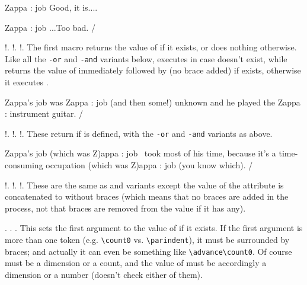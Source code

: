\ifattribute Zappa : job {Good, it is.}{...}\par
\nometa\ifattribute Zappa : job {...}{Too bad.}
\Example/





\describe*!\usevalue\paramatt.
\describe!\usevalueor\paramatt\orvalue.
\describe!\usevalueand\paramatt\andvalue\orvalue.
The first macro returns the value of \paramatt if it exists, or
does nothing otherwise. Like all the \verb/-or/ and \verb/-and/
variants below, \com\usevalueor executes \orvalue in case 
\paramatt doesn't exist, while \com\usevalueand returns
the value of \paramatt immediately followed by \andvalue
(no brace added) if \paramatt exists, otherwise it executes
\orvalue.

\Example
Zappa's job was \usevalueand Zappa : job 
                             { (and then some!)}
                             {unknown}
and he played the \usevalueor Zappa : instrument 
                              {guitar}.
\Example/


\describe*!\passvalue\codarg\paramatt.
\describe!\passvalueor\codarg\paramatt\orvalue.
\describe!\passvalueand\codarg\paramatt\andvalue\orvalue.
These return \codarg{} if \paramatt is defined,
with the \verb/-or/ and \verb/-and/ variants as above.

\Example
\def\whichwas#1{(which was #1)}
Zappa's job \passvalue\whichwas Zappa : job \ took
most of his time, because it's a time-consuming
occupation \nometa\passvalueor\whichwas Zappa : job
                               {(you know which)}.
\Example/

\describe*!\passvaluenobraces\codarg\paramatt.
\describe!\passvaluenobracesor\codarg\paramatt\orvalue.
\describe!\passvaluenobracesand\codarg\paramatt\andvalue\orvalue.
These are the same as \com\passvalue and variants except the
value of the attribute is concatenated to \codarg without braces
(which means that no braces are added in the process, not that
braces are removed from the value if it has any).

\describe*\settovalue{}\paramatt.
\describe\settovalueor{}\paramatt\orvalue.
\describe\settovalueand{}\paramatt\andvalue\orvalue.
This sets the first argument to the value of \paramatt if it exists.
If the first argument is more than one token (e.g. \verb/\count0/
vs. \verb/\parindent/), it must be surrounded by braces; and actually
it can even be something like \verb/\advance\count0/. Of course
 must be a dimension or a count, and the value 
of \paramatt must be accordingly a dimension
or a number (\yax doesn't check either of them).

